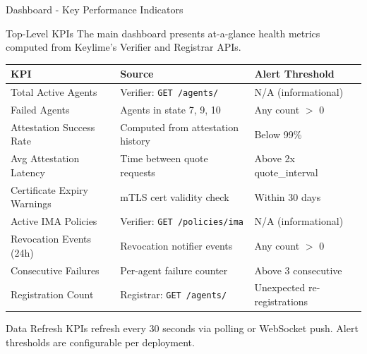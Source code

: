 \begin{frame}{Dashboard - Key Performance Indicators}
  \begin{block}{Top-Level KPIs}
    \scriptsize
    The main dashboard presents at-a-glance health metrics computed from
    Keylime's Verifier and Registrar APIs.
  \end{block}

  \vspace{0.1cm}

  \scriptsize
  \begin{center}
    \begin{tabular}{|l|p{4cm}|p{3.5cm}|}
      \hline
      \textbf{KPI} & \textbf{Source} & \textbf{Alert Threshold} \\
      \hline
      \hline
      Total Active Agents & Verifier: \texttt{GET /agents/} & N/A (informational) \\
      \hline
      Failed Agents & Agents in state 7, 9, 10 & Any count $>$ 0 \\
      \hline
      Attestation Success Rate & Computed from attestation history & Below 99\% \\
      \hline
      Avg Attestation Latency & Time between quote requests & Above 2x quote\_interval \\
      \hline
      Certificate Expiry Warnings & mTLS cert validity check & Within 30 days \\
      \hline
      Active IMA Policies & Verifier: \texttt{GET /policies/ima} & N/A (informational) \\
      \hline
      Revocation Events (24h) & Revocation notifier events & Any count $>$ 0 \\
      \hline
      Consecutive Failures & Per-agent failure counter & Above 3 consecutive \\
      \hline
      Registration Count & Registrar: \texttt{GET /agents/} & Unexpected re-registrations \\
      \hline
    \end{tabular}
  \end{center}

  \vspace{0.2cm}

  \begin{alertblock}{Data Refresh}
    \scriptsize
    KPIs refresh every 30 seconds via polling or WebSocket push.
    Alert thresholds are configurable per deployment.
  \end{alertblock}
\end{frame}

